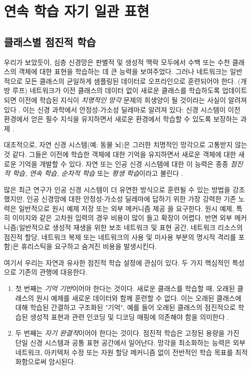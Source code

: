 \documentclass[../../book-main_ko.tex]{subfiles}
\begin{document}
\section{연속 학습 자기 일관 표현}
\label{sec:continuous}

\subsection{클래스별 점진적 학습}
\label{sec:class-wise-incremental}

우리가 보았듯이, 심층 신경망은 판별적 및 생성적 맥락 모두에서 수백 또는 수천 클래스의 객체에 대한 표현을 학습하는 데 큰 능력을 보여주었다. 그러나 네트워크는 일반적으로 모든 클래스의 균일하게 샘플링된 데이터로 오프라인으로 훈련되어야 한다. (개방 루프) 네트워크가 이전 클래스의 데이터 없이 새로운 클래스를 학습하도록 업데이트되면 이전에 학습된 지식이 {\em 치명적인 망각} 문제의 희생양이 될 것이라는 사실이 알려져 있다 \cite{McCloskey1989catastrophic}. 이는 신경 과학에서 안정성-가소성 딜레마로 알려져 있다: 신경 시스템이 이전 환경에서 얻은 필수 지식을 유지하면서 새로운 환경에서 학습할 수 있도록 보장하는 과제 \cite{Grossberg1987CompetitiveLF}.

대조적으로, 자연 신경 시스템(예: 동물 뇌)은 그러한 치명적인 망각으로 고통받지 않는 것 같다. 그들은 이전에 학습한 객체에 대한 기억을 유지하면서 새로운 객체에 대한 새로운 기억을 개발할 수 있다. 자연 또는 인공 신경 시스템에 대한 이 능력은 종종 {\em 점진적 학습, 연속 학습, 순차적 학습} 또는 {\em 평생 학습}이라고 불린다 \cite{controlled-forgetting}.

많은 최근 연구가 인공 신경 시스템이 더 유연한 방식으로 훈련될 수 있는 방법을 강조했지만, 인공 신경망에 대한 안정성-가소성 딜레마에 답하기 위한 가장 강력한 기존 노력은 일반적으로 원시 예제 저장 \cite{icarl,chaudhry2019tiny} 또는 외부 메커니즘 제공 \cite{EWC}을 요구한다. 원시 예제, 특히 이미지와 같은 고차원 입력의 경우 비용이 많이 들고 확장이 어렵다. 반면 외부 메커니즘(일반적으로 생성적 재생을 위한 보조 네트워크 및 표현 공간, 네트워크 리소스의 점진적 할당, 네트워크 복제 또는 네트워크의 사용 및 미사용 부분의 명시적 격리를 포함)은 휴리스틱을 요구하고 숨겨진 비용을 발생시킨다.

여기서 우리는 자연과 유사한 점진적 학습 설정에 관심이 있다. 두 가지 핵심적인 특성으로 기존의 관행에 대응한다.
\begin{enumerate}
    	
\item 첫 번째는 \emph{기억 기반}이어야 한다는 것이다. 새로운 클래스를 학습할 때, 오래된 클래스의 원시 예제를 새로운 데이터와 함께 훈련할 수 없다. 이는 오래된 클래스에 대해 학습된 간결하고 구조화된 "기억", 예를 들어 오래된 클래스의 점진적으로 학습된 생성적 표현과 관련 인코딩 및 디코딩 매핑에 의존해야 함을 의미한다 \cite{fearnet}.
    	
\item 두 번째는 \emph{자기 완결적}이어야 한다는 것이다. 점진적 학습은 고정된 용량을 가진 단일 신경 시스템과 공통 표현 공간에서 일어난다. 망각을 최소화하는 능력은 외부 네트워크, 아키텍처 수정 또는 자원 할당 메커니즘 없이 전반적인 학습 목표를 최적화함으로써 암시된다.
\end{enumerate}
\end{document}
